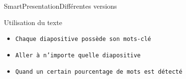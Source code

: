 \documentclass[10pt]{beamer}
\begin{document}
\begin{frame}{SmartPresentation}{Différentes versions}
	\begin{block}{Utilisation du texte}%
	  	\begin{itemize}
	  		\item {\tt Chaque diapositive possède son mots-clé}   		
    		\item {\tt Aller à n'importe quelle diapositive}
    		\item {\tt Quand un certain pourcentage de mots est détecté}
		\end{itemize}
	\end{block}
\end{frame}


\end{document}
